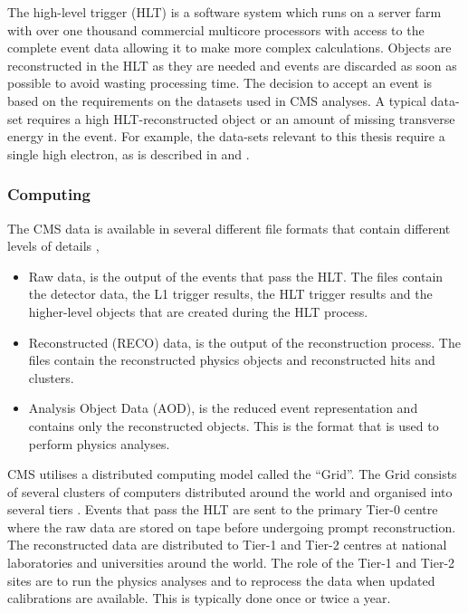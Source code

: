 The high-level trigger (HLT) is a software system which runs on a server farm
with over one thousand commercial multicore processors with access to the
complete event data allowing it to make more complex calculations. 
Objects are reconstructed in the HLT as they are needed and events are discarded
as soon as possible to avoid wasting processing time.
The decision to accept an event is based on the requirements on the datasets
used in {CMS} analyses. A typical data-set requires a high \pT
HLT-reconstructed object or an amount of missing transverse energy in the event.
For example, the data-sets relevant to this thesis require a single high \pT
electron, as is described in  and
.

\subsubsection{Computing}

The {CMS} data is available in several different file formats that contain
different levels of details \cite{grandi2004cms},
\begin{itemize}
\item Raw data, is the output of the events that pass the {HLT}. The files
contain the detector data, the {L1} trigger results, the {HLT} trigger
results and the higher-level objects that are created during the {HLT}
process.
\item Reconstructed (RECO) data, is the output of the reconstruction process.
The files contain the reconstructed physics objects and reconstructed hits and
clusters.
\item Analysis Object Data (AOD), is the reduced event representation and
contains only the reconstructed objects. This is the format that is used to
perform physics analyses.
\end{itemize}

CMS utilises a distributed computing model called the ``Grid''.  The Grid
consists of several clusters of computers distributed around the world and
organised into several tiers \cite{grandi2004cms}.  Events that pass the {HLT}
are sent to the primary Tier-0 centre where the raw data are stored on tape
before undergoing prompt reconstruction. The reconstructed data are distributed
to Tier-1 and Tier-2 centres at national laboratories and universities around the
world. The role of the Tier-1 and Tier-2 sites are to run the physics analyses
and to reprocess the data when updated calibrations are available. This is
typically done once or twice a year.

